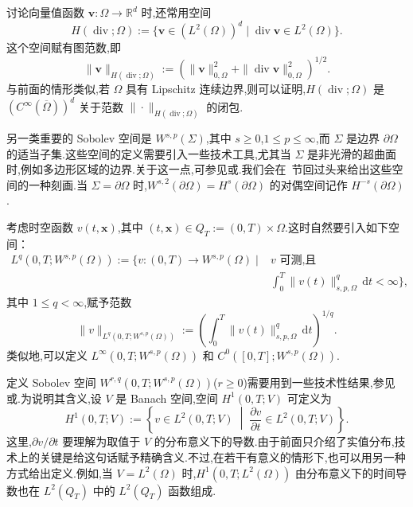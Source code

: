 讨论向量值函数 \(\boldsymbol{v}\colon\Omega\to\mathbb R^d\) 时,还常用空间
\begin{equation}\label{eq:1.2.18}
  H(\operatorname{div};\Omega):=
  \bigl\{\boldsymbol{v}\in(L^2(\Omega))^d\mid\operatorname{div}\boldsymbol{v}\in L^2(\Omega)\bigr\}.
\end{equation}
这个空间赋有图范数,即
\begin{equation}\label{eq:1.2.19}
  \|\boldsymbol{v}\|_{H(\operatorname{div};\Omega)}:=
  \left(\|\boldsymbol{v}\|_{0,\Omega}^2+\|\operatorname{div}\boldsymbol{v}\|_{0,\Omega}^2\right)^{1/2}.
\end{equation}
与前面的情形类似,若 \(\Omega\) 具有 Lipschitz 连续边界,则可以证明,\(H(\operatorname{div};\Omega)\) 是 \((C^\infty(\overline\Omega))^d\) 关于范数 \(\|\cdot\|_{H(\operatorname{div};\Omega)}\) 的闭包.

另一类重要的 Sobolev 空间是 \(W^{s,p}(\Sigma)\),其中 \(s\ge 0\),\(1\le p\le\infty\),而 \(\Sigma\) 是边界 \(\partial\Omega\) 的适当子集.这些空间的定义需要引入一些技术工具,尤其当 \(\Sigma\) 是非光滑的超曲面时,例如多边形区域的边界.关于这一点,可参见或.我们会在~节回过头来给出这些空间的一种刻画.当 \(\Sigma=\partial\Omega\) 时,\(W^{s,2}(\partial\Omega)=H^s(\partial\Omega)\) 的对偶空间记作 \(H^{-s}(\partial\Omega)\).

考虑时空函数 \(v(t,\boldsymbol{x})\),其中 \((t,\boldsymbol{x})\in Q_T:=(0,T)\times\Omega\).这时自然要引入如下空间：
\begin{equation}\label{eq:1.2.20}
  \begin{split}
    L^q(0,T;W^{s,p}(\Omega)):=\biggl\{v\colon(0,T)\to W^{s,p}(\Omega)\;\bigg|\;
    & v\text{ 可测,且}\\[-2pt]
    & \int_0^T\|v(t)\|_{s,p,\Omega}^q\,\mathrm dt<\infty\biggr\},
  \end{split}
\end{equation}
其中 \(1\le q<\infty\),赋予范数
\begin{equation}\label{eq:1.2.21}
  \|v\|_{L^q(0,T;W^{s,p}(\Omega))}:=
  \left(\int_0^T\|v(t)\|_{s,p,\Omega}^q\,\mathrm dt\right)^{1/q}.
\end{equation}
类似地,可以定义 \(L^\infty(0,T;W^{s,p}(\Omega))\) 和 \(C^0([0,T];W^{s,p}(\Omega))\).

定义 Sobolev 空间 \(W^{r,q}(0,T;W^{s,p}(\Omega))\)(\(r\ge 0\))需要用到一些技术性结果,参见或.为说明其含义,设 \(V\) 是 Banach 空间,空间 \(H^1(0,T;V)\) 可定义为
\begin{equation}\label{eq:1.2.22}
  H^1(0,T;V):=
  \left\{v\in L^2(0,T;V)\;\middle|\;\frac{\partial v}{\partial t}\in L^2(0,T;V)\right\}.
\end{equation}
这里,\(\partial v/\partial t\) 要理解为取值于 \(V\) 的分布意义下的导数.由于前面只介绍了实值分布,技术上的关键是给这句话赋予精确含义.不过,在若干有意义的情形下,也可以用另一种方式给出定义.例如,当 \(V=L^2(\Omega)\) 时,\(H^1(0,T;L^2(\Omega))\) 由分布意义下的时间导数也在 \(L^2(Q_T)\) 中的 \(L^2(Q_T)\) 函数组成.

